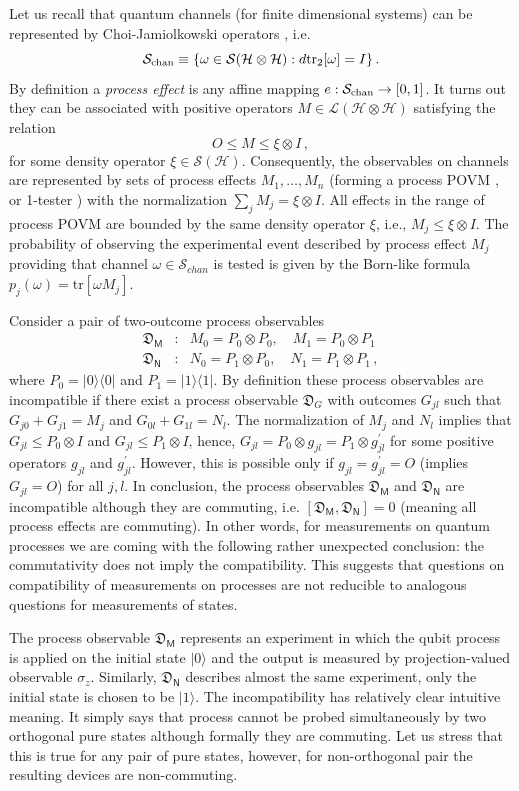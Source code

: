 \documentclass[12pt]{article}
\theoremstyle{definition}
\newcommand{\hi}{\mathcal{H}} %
\newcommand{\ket}[1]{|#1\rangle} %
\newcommand{\bra}[1]{\langle#1|} %
\newcommand{\tr}[1]{\textrm{tr}\left[#1\right]} %
\newcommand{\Mo}{\mathsf{M}}%
\newcommand{\No}{\mathsf{N}}%
\newcommand{\Dev}{\mathfrak{D}} %
\begin{document}
{Let us recall that quantum channels (for finite dimensional systems) can be 
represented by Choi-Jamiolkowski operators \cite{MLQT12}, i.e. 
$$
\mathcal{S}_{\rm chan}\equiv\{\omega\in\mathcal{S}(\hi\otimes\hi): d{\rm tr}_2[\omega]=I\} \, .
$$
By definition a \emph{process effect} is any affine mapping 
$e:\mathcal{S}_{\rm chan}\to[0,1]$. It turns out \cite{Jencova12} 
they can be associated with positive operators $M\in \mathcal{L}(\hi\otimes\hi)$ satisfying the relation
$$
O\leq M\leq \xi\otimes I\,,
$$
for some density operator $\xi\in\mathcal{S}(\hi)$. Consequently, the
observables on channels are represented by sets of process effects 
$M_1,\dots,M_n$ (forming
a process POVM \cite{Ziman08a}, or 1-tester \cite{ChDaPe09pra}) 
with the normalization $\sum_j M_j=\xi\otimes I$.
All effects in the range of process POVM are bounded by the same density operator 
$\xi$, i.e., $M_j\leq\xi\otimes I$. 
The probability of observing 
the experimental event described by process effect $M_j$ providing that 
channel $\omega\in\mathcal{S}_{chan}$ is tested is given by the Born-like 
formula $p_j(\omega)=\tr{\omega M_j}$.

Consider a pair of two-outcome process observables 
\begin{eqnarray}
\nonumber 
\Dev_\Mo&:& M_0=P_0\otimes P_0,\quad M_1=P_0\otimes P_1 \\
\Dev_\No&:& N_0=P_1\otimes P_0,\quad N_1=P_1\otimes P_1\,,
\end{eqnarray} 
where $P_0=\ket{0}\bra{0}$
and $P_1=\ket{1}\bra{1}$. By definition these process 
observables are incompatible if there exist a process observable 
$\Dev_G$ with outcomes $G_{jl}$ such that $G_{j0}+G_{j1}=M_j$ and 
$G_{0l}+G_{1l}=N_l$. The normalization of $M_j$ and $N_l$
implies that $G_{jl}\leq P_0\otimes I$ and $G_{jl}\leq P_1\otimes I$,
hence, $G_{jl}=P_0\otimes g_{jl}=P_1\otimes g_{jl}^\prime$ for some
positive operators $g_{jl}$ and $g_{jl}^\prime$. However, this is 
possible only if $g_{jl}=g_{jl}^\prime=O$ (implies $G_{jl}=O$) for 
all $j,l$. In conclusion, the process observables $\Dev_\Mo$ and $\Dev_\No$
are incompatible although they are commuting, i.e. $[\Dev_\Mo,\Dev_\No]=0$
(meaning all process effects are commuting).
In other words, for measurements on quantum processes we are coming
with the following rather unexpected conclusion: the commutativity 
does not imply the compatibility. This suggests that questions on 
compatibility of measurements on processes are not reducible to 
analogous questions for measurements of states.

The process observable $\Dev_\Mo$ represents an experiment in which the qubit 
process is applied on the initial state $\ket{0}$ and the output 
is measured by projection-valued observable $\sigma_z$. Similarly,
$\Dev_\No$ describes almost the same experiment, only the initial state 
is chosen to be $\ket{1}$. The incompatibility has relatively clear 
intuitive meaning. It simply says that process cannot be probed
simultaneously by two orthogonal pure states although formally 
they are commuting. Let us stress that this is true for any pair
of pure states, however, for non-orthogonal pair the resulting 
devices are non-commuting.

}
\end{document}
